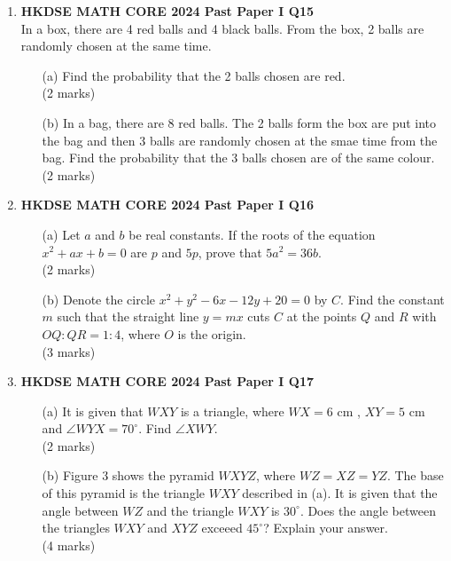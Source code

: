 \documentclass[12pt]{article}
\begin{document}
\begin{enumerate}
	\item \textbf{HKDSE MATH CORE 2024 Past Paper I Q15}\\
	In a box, there are 4 red balls and 4 black balls. From the box, 2 balls are randomly chosen at the same time.
	\begin{enumerate}
		\item[(a)] Find the probability that the 2 balls chosen are red. \\(2 marks)
		\item[(b)] In a bag, there are 8 red balls. The 2 balls form the box are put into the bag and then 3 balls are randomly chosen at the smae time from the bag. Find the probability that the 3 balls chosen are of the same colour. \\(2 marks)
	\end{enumerate}

	\item \textbf{HKDSE MATH CORE 2024 Past Paper I Q16}
	\begin{enumerate}
		\item[(a)] Let $a$ and $b$ be real constants. If the roots of the equation $x^2 + ax + b = 0$ are $p$ and $5p$, prove that $5a^2 = 36b$. \\(2 marks)
		\item[(b)] Denote the circle $x^2 + y^2 - 6x - 12y + 20 = 0$ by $C$. Find the constant $m$ such that the straight line $y = mx$ cuts $C$ at the points $Q$ and $R$ with $OQ:QR = 1:4$, where $O$ is the origin. \\(3 marks)
	\end{enumerate}

	\item \textbf{HKDSE MATH CORE 2024 Past Paper I Q17}
	\begin{enumerate}
		\item[(a)] It is given that $WXY$ is a triangle, where $WX = 6$ cm , $XY = 5$ cm and $\angle WYX = 70^\circ$. Find $\angle XWY$. \\(2 marks)
		\item[(b)] Figure 3 shows the pyramid $WXYZ$, where $WZ = XZ = YZ$. The base of this pyramid is the triangle $WXY$ described in (a).
		It is given that the angle between $WZ$ and the triangle $WXY$ is $30^\circ$. Does the angle between the triangles $WXY$ and $XYZ$ exceeed $45^\circ$? Explain your answer. \\(4 marks)
	\end{enumerate}


\end{enumerate}
\end{document}

